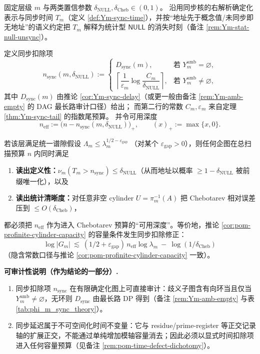 \begin{theorem}\label{thm:pom-sync-subtracted-chebotarev-capacity}
固定层级 \(m\) 与两类置信参数 \(\delta_{\mathrm{NULL}},\delta_{\mathrm{Cheb}}\in(0,1)\)。
沿用同步核的右解析确定化表示与同步时间 \(T_m\)（定义 \ref{def:Ym-sync-time}），并按“地址先于概念值/未同步即无地址”的语义约定把 \(T_m\) 解释为统计型 \(\mathsf{NULL}\) 的消失时刻（备注 \ref{rem:Ym-stat-null-unsync}）。
\par
定义同步扣除项
\[
n_{\mathrm{sync}}(m,\delta_{\mathrm{NULL}})
:=
\begin{cases}
D_{\mathrm{sync}}(m), & \text{若 }Y_m^{\mathrm{amb}}=\varnothing,\\[6pt]
\left\lceil \dfrac{1}{\varepsilon_m}\log\dfrac{C_m}{\delta_{\mathrm{NULL}}}\right\rceil,
& \text{若 }Y_m^{\mathrm{amb}}\neq\varnothing,
\end{cases}
\]
其中 \(D_{\mathrm{sync}}(m)\) 由推论 \ref{cor:Ym-sync-delay}（或更一般由备注 \ref{rem:Ym-amb-empty} 的 DAG 最长路审计口径）给出；
而第二行的常数 \(C_m,\varepsilon_m\) 来自定理 \ref{thm:Ym-sync-tail} 的指数尾预算。
并令可用深度
\[
n_{\mathrm{eff}}:=\bigl(n-n_{\mathrm{sync}}(m,\delta_{\mathrm{NULL}})\bigr)_+,
\qquad (x)_+:=\max\{x,0\}.
\]
\par
若该层满足统一谱隙假设
\(
\Lambda_m\le \lambda_m^{1/2-\varepsilon_{\mathrm{gap}}}
\)
（对某个 \(\varepsilon_{\mathrm{gap}}>0\)），则任何企图在总扫描预算 \(n\) 内同时满足
\begin{enumerate}
  \item \textbf{读出定义性：}\(\nu_m(T_m>n_{\mathrm{sync}})\le \delta_{\mathrm{NULL}}\)（从而地址以概率 \(\ge 1-\delta_{\mathrm{NULL}}\) 被前缀唯一化），以及
  \item \textbf{读出统计清晰度：}对任意非空 cylinder \(U=\pi_m^{-1}(A)\) 把 Chebotarev 相对误差压到 \(\le O(\delta_{\mathrm{Cheb}})\)，
\end{enumerate}
都必须把 \(n_{\mathrm{eff}}\) 作为进入 Chebotarev 预算的“可用深度”。等价地，推论 \ref{cor:pom-profinite-cylinder-capacity} 的容量条件发生同步扣除修正：
\[
\boxed{\;
\log |G_m|
\ \lesssim\
(1/2+\varepsilon_{\mathrm{gap}})\,n_{\mathrm{eff}}\log\lambda_m
\ -\
\log(1/\delta_{\mathrm{Cheb}})
\;}
\]
（隐含常数口径与推论 \ref{cor:pom-profinite-cylinder-capacity} 一致）。
\par
\noindent\textbf{可审计性说明（作为结论的一部分）.}
\begin{enumerate}
  \item 同步扣除项 \(n_{\mathrm{sync}}\) 在有限确定化图上可直接审计：歧义子图含有向环当且仅当 \(Y_m^{\mathrm{amb}}\neq\varnothing\)，无环则 \(D_{\mathrm{sync}}\) 由最长路 DP 得到（备注 \ref{rem:Ym-amb-empty} 与表 \ref{tab:phi_m_sync_theory}）。
  \item 同步延迟属于不可空间化时间不变量：它与 residue/prime-register 等正交记录轴的扩展正交，不能通过单纯增加模轴容量消去；因此必须以显式时间扣除项进入任何容量预算（见备注 \ref{rem:pom-time-defect-dichotomy}）。
\end{enumerate}
\end{theorem}

